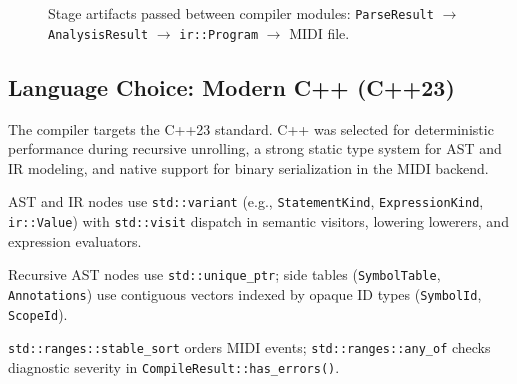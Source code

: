 \begin{figure}[htbp]
{%
  }
  \caption{Stage artifacts passed between compiler modules: \texttt{ParseResult} $\rightarrow$
    \texttt{AnalysisResult} $\rightarrow$ \texttt{ir::Program} $\rightarrow$ MIDI
  file.}\label{fig:compiler-data-artifacts}
\end{figure}

\subsection{Language Choice: Modern C++ (C++23)}\label{detail-subsec:language-choice:-modern-c++-(c++23)}

The compiler targets the C++23 standard.
C++ was selected for deterministic performance during recursive unrolling, a strong static type system for AST and IR
modeling, and native support for binary serialization in the MIDI backend.


 AST and IR nodes use \texttt{std::variant} (e.g.,
\texttt{StatementKind}, \texttt{ExpressionKind}, \texttt{ir::Value}) with \texttt{std::visit} dispatch in semantic
visitors, lowering lowerers, and expression evaluators.

 Recursive AST nodes use \texttt{std::unique\_ptr}; side tables
(\texttt{SymbolTable}, \texttt{Annotations}) use contiguous vectors indexed by opaque ID types
(\texttt{SymbolId}, \texttt{ScopeId}).

 \texttt{std::ranges::stable\_sort} orders MIDI events; \texttt{std::ranges::any\_of}
checks diagnostic severity in \texttt{CompileResult::has\_errors()}.
